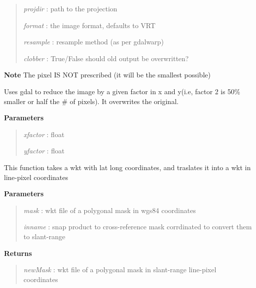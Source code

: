 \documentclass[letterpaper,10pt,openany,oneside]{sphinxmanual}
\begin{document}
\begin{fulllineitems}
\begin{fulllineitems}
\begin{quote}
\emph{projdir}  : path to the projection

\emph{format}   : the image format, defaults to VRT

\emph{resample} : resample method (as per gdalwarp)

\emph{clobber}  : True/False should old output be overwritten?
\end{quote}

\textbf{Note} The pixel IS NOT prescribed (it will be the smallest possible)

\end{fulllineitems}


\begin{fulllineitems}
\label{code:Image.Image.reduceImg}
Uses gdal to reduce the image by a given factor in x and y(i.e, factor 2 is 50\%
smaller or half the \# of pixels). It overwrites the original.

\textbf{Parameters}
\begin{quote}

\emph{xfactor} : float

\emph{yfactor} : float
\end{quote}

\end{fulllineitems}


\begin{fulllineitems}
\label{code:Image.Image.slantRangeMask}
This function takes a wkt with lat long coordinates, and traslates it into a wkt in line-pixel coordinates

\textbf{Parameters}
\begin{quote}

\emph{mask}  :  wkt file of a polygonal mask in wgs84 coordinates

\emph{inname}  :  snap product to cross-reference mask corrdinated to convert them to slant-range
\end{quote}

\textbf{Returns}
\begin{quote}

\emph{newMask}  : wkt file of a polygonal mask in slant-range line-pixel coordinates
\end{quote}


\end{fulllineitems}
\end{fulllineitems}
\end{document}
